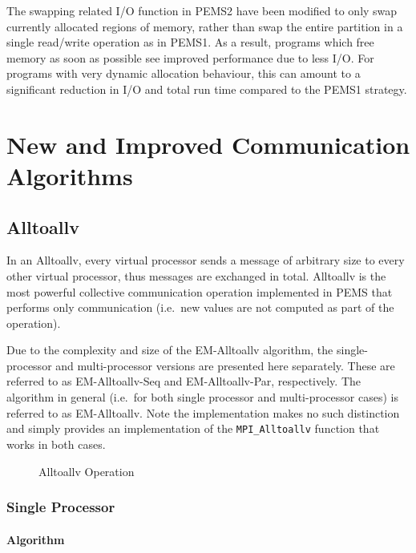 \documentclass[12pt]{carletoncsthesis}
\begin{document}
The swapping related I/O function in PEMS2 have been modified to only swap
currently allocated regions of memory, rather than swap the entire partition
in a single read/write operation as in PEMS1.  As a result, programs which
free memory as soon as possible see improved performance due to less I/O.
For programs with very dynamic allocation behaviour, this can amount to a
significant reduction in I/O and total run time compared to the PEMS1 strategy.



\chapter{New and Improved Communication Algorithms}
\thispagestyle{empty}
\label{comm-algs}


\section{Alltoallv}


In an {\sc Alltoallv}, every virtual processor sends a message of arbitrary
size to every other virtual processor, thus  messages are exchanged
in total.  {\sc Alltoallv} is the most powerful collective communication
operation implemented in PEMS that performs only communication (i.e.\ new
values are not computed as part of the operation).

Due to the complexity and size of the {\sc EM-Alltoallv} algorithm, the
single-processor and multi-processor versions are presented here separately.
These are referred to as {\sc EM-Alltoallv-Seq} and {\sc EM-Alltoallv-Par},
respectively.  The algorithm in general (i.e.\ for both single processor
and multi-processor cases) is referred to as {\sc EM-Alltoallv}.  Note the
implementation makes no such distinction and simply provides an implementation
of the {\tt MPI\_Alltoallv} function that works in both cases.

\begin{figure}[ht]
\begin{center}
\caption{Alltoallv Operation}
\end{center}
\end{figure}

\clearpage
\subsection{Single Processor}


\subsubsection{Algorithm}
\end{document}
